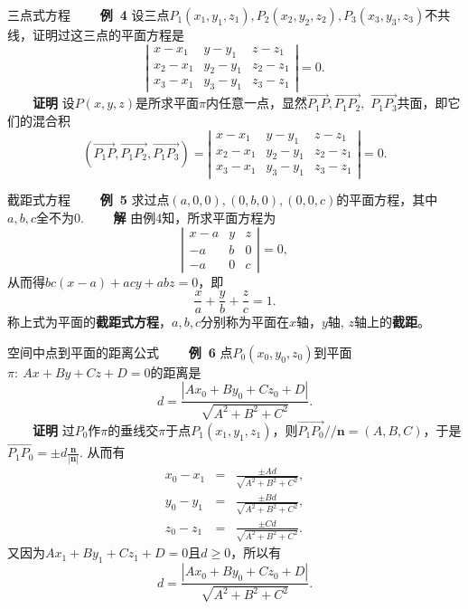 \documentclass[compress,mathserif,cjk]{beamer}
\theoremstyle{remark}
\numberwithin{equation}{section}
\newcommand{\hei}{\bf}      %
\begin{document}
\begin{CJK}{UTF8}{gbsn}
\begin{frame}{三点式方程}
 \ \ \ \ {\hei 例~4} 设三点$P_1(x_1,y_1,z_1),P_2(x_2,y_2,z_2),P_3(x_3,y_3,z_3)$不共线，证明过这三点的平面方程是
 $$\left|\begin{matrix}x-x_1&y-y_1&z-z_1\\x_2-x_1&y_2-y_1&z_2-z_1\\x_3-x_1&y_3-y_1&z_3-z_1\end{matrix}\right|=0.$$
 \pause
 \ \ \ \ {\hei 证明} 设$P(x,y,z)$是所求平面$\pi$内任意一点，显然$\overset{\longrightarrow}{P_1P},\overset{\longrightarrow}{P_1P_2},$ $\overset{\longrightarrow}{P_1P_3}$共面，即它们的混合积
 $$(\overset{\longrightarrow}{P_1P},\overset{\longrightarrow}{P_1P_2},\overset{\longrightarrow}{P_1P_3})
 =\left|\begin{matrix}x-x_1&y-y_1&z-z_1\\x_2-x_1&y_2-y_1&z_2-z_1\\x_3-x_1&y_3-y_1&z_3-z_1\end{matrix}\right|=0.$$
\end{frame}

\begin{frame}{截距式方程}
\ \ \ \ {\hei 例~5} 求过点$(a,0,0),(0,b,0),(0,0,c)$的平面方程，其中$a,b,c$全不为0.
\pause\vskip 5pt
 \ \ \ \ {\hei 解} 由例4知，所求平面方程为
 $$\left|\begin{matrix}x-a&y&z\\-a&b&0\\-a&0&c\end{matrix}\right|=0,$$
 从而得$bc(x-a)+acy+abz=0$，即
 $$\frac{x}a+\frac{y}b+\frac{z}c=1.$$
 称上式为平面的{\hei 截距式方程}，$a,b,c$分别称为平面在$x$轴，$y$轴, $z$轴上的{\hei 截距}。
\end{frame}

\begin{frame}{空间中点到平面的距离公式}\small
 \ \ \ \ {\hei 例~6} 点$P_0(x_0,y_0,z_0)$到平面$\pi:~Ax+By+Cz+D=0$的距离是
 $$d=\frac{|Ax_0+By_0+Cz_0+D|}{\sqrt{A^2+B^2+C^2}}.$$
 \pause
 \ \ \ \ {\hei 证明} 过$P_0$作$\pi$的垂线交$\pi$于点$P_1(x_1,y_1,z_1)$，则$\overset{\longrightarrow}{P_1P_0}//\bm n=(A,B,C)$，于是$\overset{\longrightarrow}{P_1P_0}=\pm d\frac{\bm n}{|\bm n|}$. 从而有
 \begin{eqnarray*}
 x_0-x_1&=&\frac{\pm Ad}{\sqrt{A^2+B^2+C^2}},\\
 y_0-y_1&=&\frac{\pm Bd}{\sqrt{A^2+B^2+C^2}},\\
 z_0-z_1&=&\frac{\pm Cd}{\sqrt{A^2+B^2+C^2}}.
 \end{eqnarray*}
 又因为$Ax_1+By_1+Cz_1+D=0$且$d\geq0$，所以有
 $$d=\frac{|Ax_0+By_0+Cz_0+D|}{\sqrt{A^2+B^2+C^2}}.$$


\end{frame}
\end{CJK}
\end{document}
